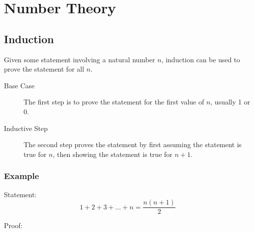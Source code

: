 \chapter{Number Theory}

\section{Induction}

Given some statement involving
a natural number $n$, induction
can be used to prove the statement
for all $n$.
\begin{description}
    \item[Base Case] The first step is to prove the
    statement for the first value of $n$, usually
    1 or 0.

    \item[Inductive Step] The second step proves
    the statement by first assuming the statement
    is true for $n$, then showing the statement
    is true for $n + 1$.
\end{description}

\subsection{Example}

Statement:
$$1 + 2 + 3 + ... + n = \frac{n(n + 1)}{2}$$

\noindent
Proof:

